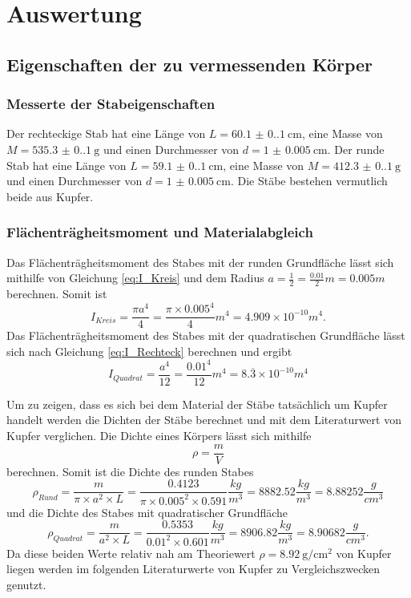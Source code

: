 \section{Auswertung}
\label{sec:Auswertung}
\subsection{Eigenschaften der zu vermessenden Körper}
\subsubsection{Messerte der Stabeigenschaften}
Der rechteckige Stab hat eine Länge von $L=\qty{60.1(0.1)}{\centi\meter}$, eine Masse von $M=\qty{535.3(0.1)}{\gram}$
und einen Durchmesser von $d=\qty{1(0.005)}{\centi\meter}$.
Der runde Stab hat eine Länge von $L=\qty{59.1(0.1)}{\centi\meter}$, eine Masse von $M=\qty{412.3(0.1)}{\gram}$
und einen Durchmesser von $d=\qty{1(0.005)}{\centi\meter}$.
Die Stäbe bestehen vermutlich beide aus Kupfer.
\subsubsection{Flächenträgheitsmoment und Materialabgleich}
Das Flächenträgheitsmoment des Stabes mit der runden Grundfläche lässt sich mithilfe von Gleichung \eqref{eq:I_Kreis} und dem Radius $a=\frac{1}{2}=\frac{0.01}{2}m=0.005m$ berechnen.
Somit ist
\begin{equation}
  I_{Kreis}=\frac{\pi a^4}{4}=\frac{\pi\times 0.005^4}{4}m^4=4.909\times 10^{-10}m^4\text{.}
\end{equation}
Das Flächenträgheitsmoment des Stabes mit der quadratischen Grundfläche lässt sich nach Gleichung \eqref{eq:I_Rechteck} berechnen und ergibt
\begin{equation}
  I_{Quadrat}=\frac{a^4}{12}=\frac{0.01^4}{12}m^4=8.\overline{3}\times 10^{-10}m^4
\end{equation}

Um zu zeigen, dass es sich bei dem Material der Stäbe tatsächlich um Kupfer handelt werden die Dichten der Stäbe berechnet und mit dem Literaturwert von Kupfer verglichen.
Die Dichte eines Körpers lässt sich mithilfe
\begin{equation}
  \rho=\frac{m}{V}
\end{equation}
berechnen. Somit ist die Dichte des runden Stabes
\begin{equation}
  \rho_{Rund}=\frac{m}{\pi \times a^2 \times L}=\frac{0.4123}{\pi \times 0.005^2 \times 0.591}\frac{kg}{m^3}=8882.52\frac{kg}{m^3}=8.88252\frac{g}{cm^3}
\end{equation}
und die Dichte des Stabes mit quadratischer Grundfläche
\begin{equation}
  \rho_{Quadrat}=\frac{m}{a^2 \times L}=\frac{0.5353}{0.01^2 \times 0.601}\frac{kg}{m^3}=8906.82\frac{kg}{m^3}=8.90682\frac{g}{cm^3}\text{.}
\end{equation}
Da diese beiden Werte relativ nah am Theoriewert $\rho=\qty{8.92}{\gram\per\centi\meter\squared}$ von Kupfer liegen werden im folgenden Literaturwerte von Kupfer zu Vergleichszwecken genutzt.
